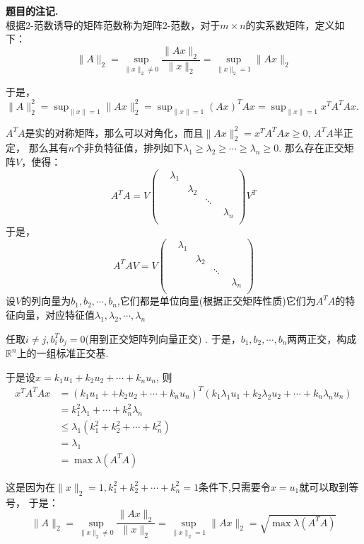 \documentclass[12pt, a4paper, oneside]{ctexart}
\newcounter{problemname}
\newenvironment{note}{\par\noindent\textbf{题目\arabic{problemname}的注记. }}{\par}
\begin{document}
\begin{note}
$$    $$
    根据2-范数诱导的矩阵范数称为矩阵2-范数，对于$m\times n$的实系数矩阵，定义如下：
   $$
   \|A\|_2=\sup_{\|x\|_2\neq 0}\dfrac{\|Ax\|_2}{\|x\|_2}=\sup_{\|x\|_2=1 }\|Ax\|_2
   $$
   \par
   于是，$\|A\|_2^2=\sup_{\|x\|=1}\|Ax\|_2^2=\sup_{\|x\|=1}(Ax)^TAx=\sup_{\|x\|=1}x^TA^TAx$.
   \par
   $A^TA$是实的对称矩阵，那么可以对角化，而且$\|Ax\|_2^2=x^TA^TAx\geqslant 0$, $A^TA$半正定，
   那么其有$n$个非负特征值，排列如下$\lambda_1\geqslant \lambda_2\geqslant \cdots \geqslant \lambda_n\geqslant 0$.
   那么存在正交矩阵$V$，使得：
   $$
   A^TA=V\begin{pmatrix}
    &\lambda_1 &\quad &\quad &\quad\\
    &\quad &\lambda_2 &\quad &\quad\\
    &\quad &\quad &\ddots &\quad\\
    &\quad &\quad &\quad &\lambda_n\\
   \end{pmatrix}
   V^T
   $$
   于是，
   $$
   A^TAV=V\begin{pmatrix}
    &\lambda_1 &\quad &\quad &\quad\\
    &\quad &\lambda_2 &\quad &\quad\\
    &\quad &\quad &\ddots &\quad\\
    &\quad &\quad &\quad &\lambda_n\\
   \end{pmatrix}
   $$
   设$V$的列向量为$b_1,b_2,\cdots,b_n$,它们都是单位向量(根据正交矩阵性质)它们为$A^TA$的特征向量，对应特征值$\lambda_1,\lambda_2,\cdots, \lambda_n$
   \par
   任取$i\neq j, b_i^Tb_j=0$(用到正交矩阵列向量正交) .
   于是，$b_1,b_2,\cdots,b_n$两两正交，构成$\mathbb{R}^n$上的一组标准正交基.
   \par
   于是设$x=k_1u_1+k_2u_2+\cdots+k_nu_n$,
   则$$
   \begin{aligned}
   x^TA^TAx&=(k_1u_1++k_2u_2+\cdots+k_nu_n)^T(k_1\lambda_1u_1+k_2\lambda_2u_2+\cdots+k_n\lambda_nu_n)\\
   &=k_1^2\lambda_1+\cdots+k_n^2\lambda_n\\
   &\leqslant \lambda_1(k_1^2+k_2^2+\cdots+k_n^2)\\
   &=\lambda_1\\
   &=\max \lambda(A^TA)
   \end{aligned}
   $$
   \par
   这是因为在$\|x\|_2=1, k_1^2+k_2^2+\cdots+k_n^2=1$条件下,只需要令$x=u_1$就可以取到等号，
   于是：
   $$
   \|A\|_2=\sup_{\|x\|_2\neq 0}\dfrac{\|Ax\|_2}{\|x\|_2}=\sup_{\|x\|_2=1 }\|Ax\|_2=\sqrt{\max \lambda(A^TA)}
   $$
\end{note}
\end{document}
